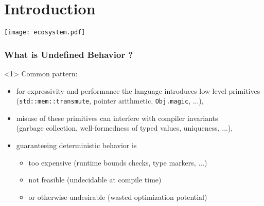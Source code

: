 \begin{frame}
    \titlepage
\end{frame}

\section{Introduction}


\begin{frame}
    \texttt{[image: ecosystem.pdf]}
\end{frame}

\begin{frame}[fragile, t]
    \frametitle{What is Undefined Behavior ?}

    \begin{onlyenv}<1>
        Common pattern:
        \begin{itemize}
            \item for expressivity and performance the language introduces low level primitives \\
                (\texttt{std::mem::transmute}, pointer arithmetic, \texttt{Obj.magic}, ...),
            \item misuse of these primitives can interfere with compiler invariants \\
                (garbage collection, well-formedness of typed values, uniqueness, ...),
            \item guaranteeing deterministic behavior is
                \begin{itemize}
                    \item too expensive
                        (runtime bounds checks, type markers, ...)
                    \item not feasible
                        (undecidable at compile time)
                    \item or otherwise undesirable
                        (wasted optimization potential)
                \end{itemize}
        \end{itemize}
    \end{onlyenv}


\end{frame}
